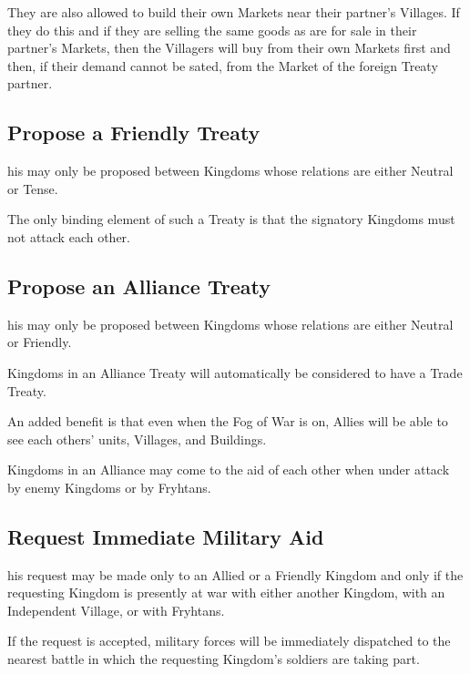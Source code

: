 They are also allowed to build their own Markets near their partner’s Villages. If they do this and if they are selling the same goods as are for sale in their partner’s Markets, then the Villagers will buy from their own Markets first and then, if their demand cannot be sated, from the Market of the foreign Treaty partner.

\subsection{Propose a Friendly Treaty}


his may only be proposed between Kingdoms whose relations are either Neutral or Tense.

The only binding element of such a Treaty is that the signatory Kingdoms must not attack each other.

\subsection{Propose an Alliance Treaty}


his may only be proposed between Kingdoms whose relations are either Neutral or Friendly.

Kingdoms in an Alliance Treaty will automatically be considered to have a Trade Treaty.

An added benefit is that even when the Fog of War is on, Allies will be able to see each others’ units, Villages, and Buildings.

Kingdoms in an Alliance may come to the aid of each other when under attack by enemy Kingdoms or by Fryhtans.

\subsection{Request Immediate Military Aid}


his request may be made only to an Allied or a Friendly Kingdom and only if the requesting Kingdom is presently at war with either another Kingdom, with an Independent Village, or with Fryhtans.

If the request is accepted, military forces will be immediately dispatched to the nearest battle in which the requesting Kingdom’s soldiers are taking part.

